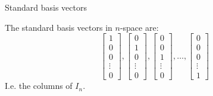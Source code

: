 \documentclass{beamer}
\begin{document}
\begin{frame}{Standard basis vectors}
  \begin{definition}
    The standard basis vectors in $n$-space are:
    \begin{equation*}
      \left[
	\begin{array}{c}
          1\\
          0\\
          0\\
          \vdots\\
          0
	\end{array}
      \right],
      \left[
	\begin{array}{c}
          0\\
          1\\
          0\\
          \vdots\\
          0
	\end{array}
      \right],
      \left[
	\begin{array}{c}
          0\\
          0\\
          1\\
          \vdots\\
          0
	\end{array}
      \right],\dots,
      \left[
	\begin{array}{c}
          0\\
          0\\
          0\\
          \vdots\\
          1
	\end{array}
      \right]
    \end{equation*}
    I.e. the columns of $I_n$.
  \end{definition}
\end{frame}
\end{document}
